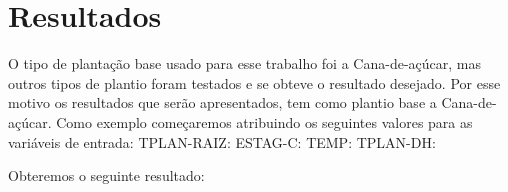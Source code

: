 \section{Resultados}

O tipo de plantação base usado para esse trabalho foi a Cana-de-açúcar, mas outros tipos de plantio foram testados e se obteve o resultado desejado. Por esse motivo os resultados que serão apresentados, tem como plantio base a Cana-de-açúcar.
Como exemplo começaremos atribuindo os seguintes valores para as variáveis de entrada:
TPLAN-RAIZ:
ESTAG-C:
TEMP:
TPLAN-DH:

Obteremos o seguinte resultado: 
